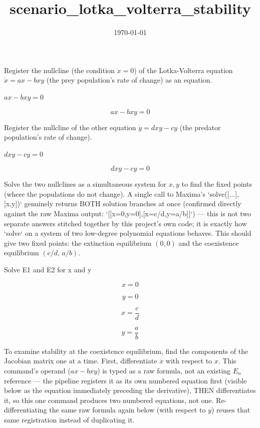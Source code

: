 \documentclass[dvipdfmx]{article}
\title{scenario\_lotka\_volterra\_stability}
\date{\today}
\begin{document}
\maketitle

Register the nullcline (the condition $\dot x=0$) of the Lotka-Volterra equation $\dot x=ax-bxy$ (the prey population's rate of change) as an equation.

$a x - b x y = 0$

\begin{equation}
  a x - b x y = 0
  \label{eq:E1}
\end{equation}

Register the nullcline of the other equation $\dot y=dxy-cy$ (the predator population's rate of change).

$d x y - c y = 0$

\begin{equation}
  d x y - c y = 0
  \label{eq:E2}
\end{equation}

Solve the two nullclines as a simultaneous system for $x,y$ to find the fixed points (where the populations do not change). A single call to Maxima's `solve([...],[x,y])` genuinely returns BOTH solution branches at once (confirmed directly against the raw Maxima output: `[[x=0,y=0],[x=c/d,y=a/b]]`) — this is not two separate answers stitched together by this project's own code; it is exactly how `solve` on a system of two low-degree polynomial equations behaves. This should give two fixed points: the extinction equilibrium $(0,0)$ and the coexistence equilibrium $(c/d,\,a/b)$.

Solve E1 and E2 for x and y

\begin{equation}
  x = 0
  \label{eq:E3}
\end{equation}

\begin{equation}
  y = 0
  \label{eq:E4}
\end{equation}

\begin{equation}
  x = \frac{c}{d}
  \label{eq:E5}
\end{equation}

\begin{equation}
  y = \frac{a}{b}
  \label{eq:E6}
\end{equation}

To examine stability at the coexistence equilibrium, find the components of the Jacobian matrix one at a time. First, differentiate $\dot x$ with respect to $x$. This command's operand ($a x-bxy$) is typed as a raw formula, not an existing $E_n$ reference — the pipeline registers it as its own numbered equation first (visible below as the equation immediately preceding the derivative), THEN differentiates it, so this one command produces two numbered equations, not one. Re-differentiating the same raw formula again below (with respect to $y$) reuses that same registration instead of duplicating it.
\end{document}

